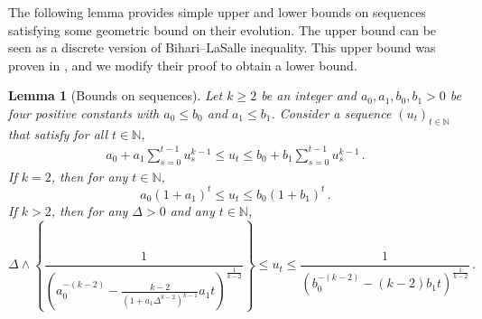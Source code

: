 \documentclass[11pt]{article}
\newcommand{\<}{\langle}
\renewcommand{\>}{\rangle}
\newtheorem{lemma}{Lemma}
\theoremstyle{definition}
\def\naturals{{\mathbb N}}
\def\naturals{{\mathbb N}}
\def\naturals{{\mathbb N}}
\begin{document}
The following lemma provides simple upper and lower bounds on sequences satisfying some geometric bound on their evolution. The upper bound can be seen as a discrete version of Bihari–LaSalle inequality. This upper bound was proven in \cite[Appendix C]{arous2021online}, and we modify their proof to obtain a lower bound.


\begin{lemma}[Bounds on sequences]\label{lem:bound_sequences}
Let $k\geq 2$ be an integer and $a_0,a_1,b_0,b_1>0$ be four positive constants with $a_0 \leq b_0$ and $a_1 \leq b_1$. Consider a sequence $(u_t)_{t \in \naturals}$ that satisfy for all $t \in \naturals$,
\[
\begin{aligned}
a_0 + a_1 \sum_{s = 0}^{t-1} u_s^{k-1} \leq u_t \leq b_0 + b_1 \sum_{s = 0}^{t-1} u_s^{k-1} \, .
\end{aligned}
\]
If $k = 2$, then for any $t \in \naturals$,
\[
a_0 (1 +a_1)^t \leq u_t \leq b_0 (1 + b_1)^t \, .
\]
If $k > 2$, then for any $\Delta > 0$ and any $t \in \naturals$,
\[
\Delta \wedge \left\{ \frac{1}{\left(a_0^{-(k-2)} - \frac{k-2}{(1 +a_1 \Delta^{k-2} )^{k-1}} a_1 t \right)^{\frac{1}{k-2}}} \right\}  \leq u_t \leq \frac{1}{\left(b_0^{-(k-2)} -  (k-2) b_1  t \right)^{\frac{1}{k-2}}} \, .
\]
\end{lemma}
\end{document}
